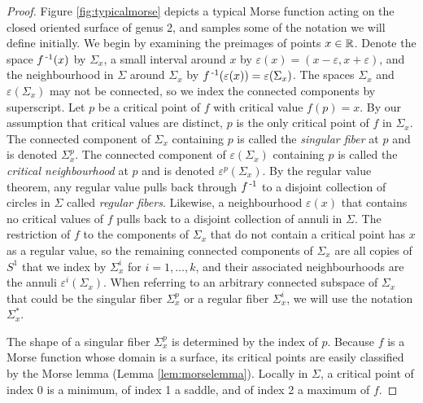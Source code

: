 \begin{proof}
	Figure \ref{fig:typicalmorse} depicts a typical Morse function acting on the closed oriented surface of genus 2, and samples some of the notation we will define initially.
	We begin by examining the preimages of points $x\in\mathbb{R}$.
	Denote the space $f^{\,\text{-}1}(x)$ by $\Sigma_x$, a small interval around $x$ by $\varepsilon(x)=(x-\varepsilon,x+\varepsilon)$, and the neighbourhood in $\Sigma$ around $\Sigma_x$ by $f^{\,\text{-}1}(\varepsilon(x))=\varepsilon(\Sigma_x)$.
	The spaces $\Sigma_x$ and $\varepsilon(\Sigma_x)$ may not be connected, so we index the connected components by superscript.
	Let $p$ be a critical point of $f$ with critical value $f(p)=x$.
	By our assumption that critical values are distinct, $p$ is the only critical point of $f$ in $\Sigma_x$.
	The connected component of $\Sigma_x$ containing $p$ is called the \emph{singular fiber} at $p$ and is denoted $\Sigma_x^p$.
	The connected component of $\varepsilon(\Sigma_x)$ containing $p$ is called the \emph{critical neighbourhood} at $p$ and is denoted $\varepsilon^p(\Sigma_x)$.
	By the regular value theorem, any regular value pulls back through $f^{\,\text{-}1}$ to a disjoint collection of circles in $\Sigma$ called \emph{regular fibers}.
	Likewise, a neighbourhood $\varepsilon(x)$ that contains no critical values of $f$ pulls back to a disjoint collection of annuli in $\Sigma$.
	The restriction of $f$ to the components of $\Sigma_x$ that do not contain a critical point has $x$ as a regular value, so the remaining connected components of $\Sigma_x$ are all copies of $S^1$ that we index by $\Sigma_x^i$ for $i=1,\dots,k$, and their associated neighbourhoods are the annuli $\varepsilon^i(\Sigma_x)$.
	When referring to an arbitrary connected subspace of $\Sigma_x$ that could be the singular fiber $\Sigma_x^p$ or a regular fiber $\Sigma_x^i$, we will use the notation $\Sigma_x^*$.
	
	The shape of a singular fiber $\Sigma_x^p$ is determined by the index of $p$.
	Because $f$ is a Morse function whose domain is a surface, its critical points are easily classified by the Morse lemma (Lemma \ref{lem:morselemma}).
	Locally in $\Sigma$, a critical point of index 0 is a minimum, of index 1 a saddle, and of index 2 a maximum of $f$.
	

\end{proof}
